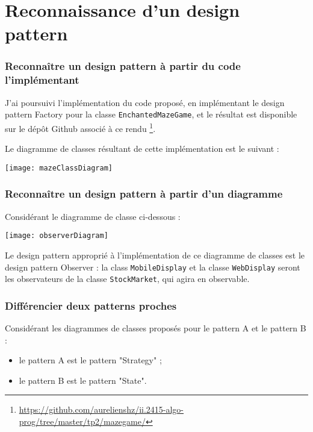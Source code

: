 \part{Reconnaissance d'un design pattern}

  \section{Reconnaître un design pattern à partir du code l'implémentant}

    J'ai poursuivi l'implémentation du code proposé, en implémentant
    le design pattern Factory pour la classe \texttt{EnchantedMazeGame}, et le résultat est disponible sur
    le dépôt Github associé à ce rendu
    \footnote{\url{https://github.com/aurelienshz/ii.2415-algo-prog/tree/master/tp2/mazegame/}}.

    Le diagramme de classes résultant de cette implémentation est le suivant :

    \begin{center}
      \texttt{[image: mazeClassDiagram]}
    \end{center}

\newpage
  \section{Reconnaître un design pattern à partir d'un diagramme}

    Considérant le diagramme de classe ci-dessous :

    \begin{center}
      \texttt{[image: observerDiagram]}
    \end{center}

    Le design pattern approprié à l'implémentation de ce diagramme de classes est le design pattern Observer :
    la class \texttt{MobileDisplay} et la classe \texttt{WebDisplay} seront les observateurs de la classe
    \texttt{StockMarket}, qui agira en observable.

  \section{Différencier deux patterns proches}

    Considérant les diagrammes de classes proposés pour le pattern A et le pattern B :
    \begin{itemize}
      \item le pattern A est le pattern "Strategy" ;
      \item le pattern B est le pattern "State".
    \end{itemize}

